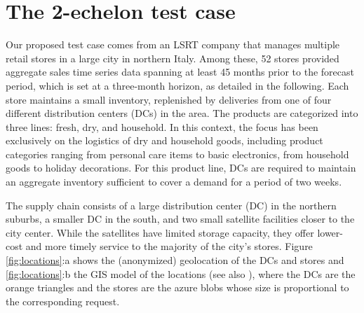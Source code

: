 \documentclass[ijoc,sglanonrev]{informs4}
\begin{document}


\section{The 2-echelon test case} \label{Sec:testcase}

Our proposed test case comes from an LSRT company that manages multiple retail stores in a large city in northern Italy. Among these, 52 stores provided aggregate sales time series data spanning at least 45 months prior to the forecast period, which is set at a three-month horizon, as detailed in the following. Each store maintains a small inventory, replenished by deliveries from one of four different distribution centers (DCs) in the area. The products are categorized into three lines: fresh, dry, and household. In this context, the focus has been exclusively on the logistics of dry and household goods, including product categories ranging from personal care items to basic electronics, from household goods to holiday decorations. For this product line, DCs are required to maintain an aggregate inventory sufficient to cover a demand for a period of two weeks.

The supply chain consists of a large distribution center (DC) in the northern suburbs, a smaller DC in the south, and two small satellite facilities closer to the city center. While the satellites have limited storage capacity, they offer lower-cost and more timely service to the majority of the city's stores. Figure \ref{fig:locations}:a shows the (anonymized) geolocation of the DCs and stores and \ref{fig:locations}:b the GIS model of the locations (see also \citealp{MZ23}), where the DCs are the orange triangles and the stores are the azure blobs whose size is proportional to the corresponding request.
\end{document}

